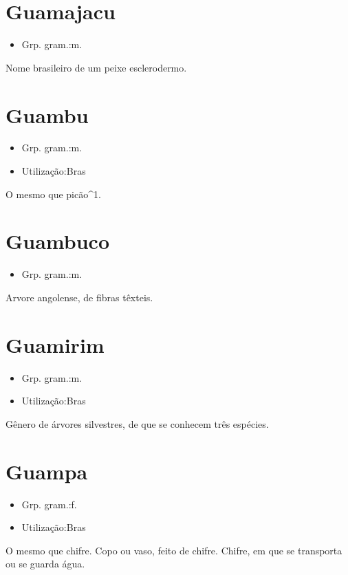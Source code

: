 \section{Guamajacu}
\begin{itemize}
\item {Grp. gram.:m.}
\end{itemize}
Nome brasileiro de um peixe esclerodermo.
\section{Guambu}
\begin{itemize}
\item {Grp. gram.:m.}
\end{itemize}
\begin{itemize}
\item {Utilização:Bras}
\end{itemize}
O mesmo que \textunderscore picão\textunderscore ^1.
\section{Guambuco}
\begin{itemize}
\item {Grp. gram.:m.}
\end{itemize}
Arvore angolense, de fibras têxteis.
\section{Guamirim}
\begin{itemize}
\item {Grp. gram.:m.}
\end{itemize}
\begin{itemize}
\item {Utilização:Bras}
\end{itemize}
Gênero de árvores silvestres, de que se conhecem três espécies.
\section{Guampa}
\begin{itemize}
\item {Grp. gram.:f.}
\end{itemize}
\begin{itemize}
\item {Utilização:Bras}
\end{itemize}
O mesmo que \textunderscore chifre\textunderscore .
Copo ou vaso, feito de chifre.
Chifre, em que se transporta ou se guarda água.
